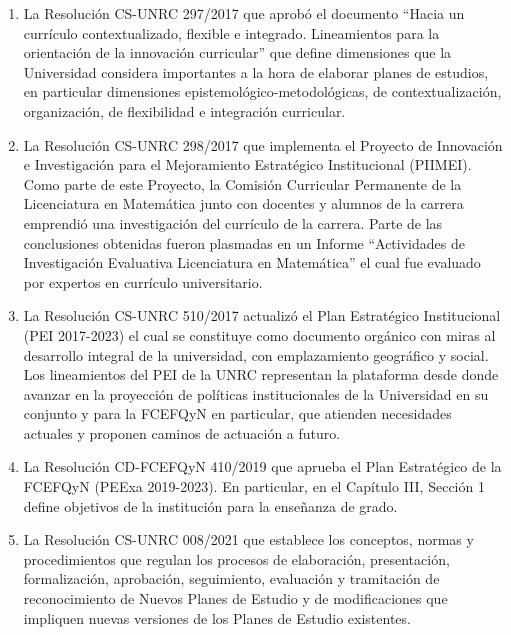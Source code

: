 \documentclass[a4paper, 12pt]{article}
\begin{document}
\begin{enumerate}
 \item La Resolución CS-UNRC 297/2017 que aprobó el documento ``Hacia   un   currículo contextualizado, flexible e integrado. Lineamientos para la orientación de la innovación  curricular'' que define dimensiones que la Universidad considera importantes a la hora de elaborar planes de estudios, en particular dimensiones epistemológico-metodológicas, de contextualización, organización, de flexibilidad e integración curricular. 

 \item La Resolución CS-UNRC 298/2017 que implementa el Proyecto de Innovación e Investigación para el Mejoramiento Estratégico Institucional (PIIMEI). Como parte de este Proyecto, la Comisión Curricular Permanente de la Licenciatura en Matemática junto con docentes y alumnos de la carrera emprendió una investigación del currículo de la carrera.  Parte de las conclusiones obtenidas fueron plasmadas en un Informe ``Actividades de Investigación Evaluativa
Licenciatura en Matemática'' el cual fue evaluado por expertos en currículo universitario.

\item La Resolución CS-UNRC 510/2017  actualizó el Plan Estratégico Institucional (PEI 2017-2023) el cual se constituye como documento orgánico con miras al desarrollo integral de la universidad, con emplazamiento geográfico y social. Los lineamientos del PEI de la UNRC representan la plataforma desde donde avanzar en la proyección de políticas institucionales de la Universidad en su conjunto y para la FCEFQyN en particular, que atienden necesidades actuales y proponen caminos de actuación a futuro.

\item La Resolución CD-FCEFQyN 410/2019 que aprueba el Plan Estratégico de la FCEFQyN (PEExa 2019-2023). En particular, en el Capítulo III, Sección 1 define objetivos de la institución para la enseñanza de grado.   

 \item La Resolución CS-UNRC 008/2021 que establece los conceptos, normas y procedimientos que regulan los procesos de elaboración, presentación, formalización, aprobación, seguimiento, evaluación y tramitación de reconocimiento de Nuevos Planes de Estudio y de modificaciones que impliquen nuevas versiones de los Planes de Estudio existentes.

\end{enumerate}
\end{document}
